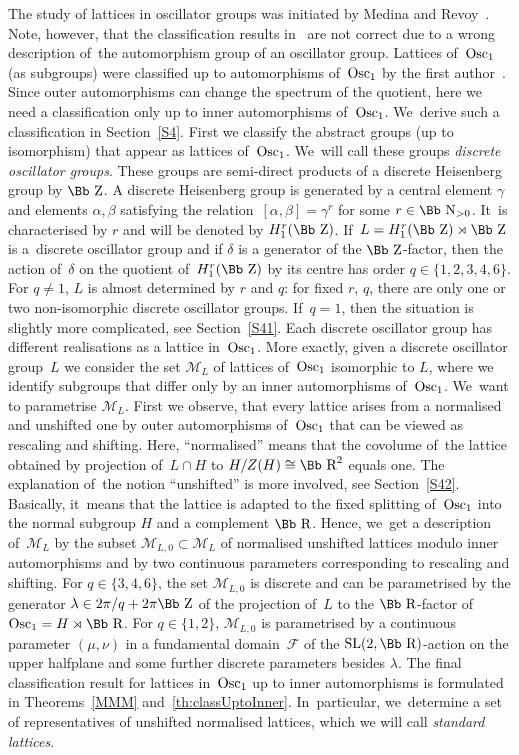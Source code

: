 \documentclass[10pt,a4paper]{amsart}
\newcommand\RR{{\mbox{\Bb R}}}
\newcommand\NN{{\mbox{\Bb N}}}
\newcommand\ZZ{{\mbox{\Bb Z}}}
\newcommand\cM{{\mathcal M}}
\newcommand\cF{{\mathcal F}}
\newcommand{\SL}{\mathop{{\rm SL}}}
\newcommand{\Osc}{{\rm Osc}}
\numberwithin{equation}{section}
\begin{document}
 The study of lattices in oscillator groups was initiated by Medina and Revoy~\cite{MR}. Note, how\-ever, that the classification results in~\cite{MR} are not correct due to a wrong description of~the automorphism group of an oscillator group. Lattices of~$\Osc_1$ (as subgroups) were classified up to automorphisms of~$\Osc_1$ by the first author~\cite{F}. Since outer automorphisms can change the spectrum of the quotient, here we need a classification only up to inner automorphisms of~$\Osc_1$. We~derive such a classification in Section~\ref{S4}. First we classify the abstract groups (up to isomorphism) that appear as lattices of~$\Osc_1$. We~will call these groups {\it discrete oscillator groups}. These groups are semi-direct products of a discrete Heisenberg group by $\ZZ$. A discrete Heisenberg group is generated by a central element $\gamma$ and elements $\alpha,\beta$ satisfying the relation~$[\alpha,\beta]=\gamma^r$ for some $r\in\NN_{>0}$. It~is characterised by $r$ and will be denoted by $H_1^r(\ZZ)$. If~$L=H_1^r(\ZZ)\rtimes \ZZ$ is a~discrete oscillator group and if $\delta$ is a generator of the $\ZZ$-factor, then the action of~$\delta$ on the quotient of~$H_1^r(\ZZ)$ by its centre has order $q\in\{1,2,3,4,6\}$. For $q\not=1$, $L$ is almost determined by $r$ and $q$: for fixed $r$, $q$, there are only one or two non-isomorphic discrete oscillator groups. If~$q=1$, then the situation is slightly more complicated, see Section~\ref{S41}. Each discrete oscillator group has different realisations as a lattice in~$\Osc_1$. More exactly, given a discrete oscillator group~$L$ we consider the set $\cM_L$ of lattices of~$\Osc_1$ isomorphic to $L$, where we identify subgroups that differ only by an inner automorphisms of~$\Osc_1$. We~want to parametrise $\cM_L$. First we observe, that every lattice arises from a normalised and unshifted one by outer automorphisms of~$\Osc_1$ that can be viewed as rescaling and shifting. Here, ``normalised'' means that the covolume of~the lattice obtained by projection of~$L\cap H$ to $H/Z(H)\cong \RR^2$ equals one. The explanation of~the notion ``unshifted'' is more involved, see Section~\ref{S42}. Basically, it~means that the lattice is adapted to the fixed splitting of~$\Osc_1$ into the normal subgroup $H$ and a complement $\RR$. Hence, we~get a description of~$\cM_L$ by the subset $\cM_{L,0}\subset \cM_L$ of normalised unshifted lattices modulo inner automorphisms and by two continuous parameters corresponding to rescaling and shifting. For $q\in\{3,4,6\}$, the set $\cM_{L,0}$ is discrete and can be parametrised by the generator $\lambda\in 2\pi/q +2\pi\ZZ$ of the projection of~$L$ to the $\RR$-factor of~$\Osc_1=H\rtimes \RR$. For $q\in\{1,2\}$, $\cM_{L,0}$ is parametrised by a continuous parameter $(\mu,\nu)$ in a fundamental domain~$\cF$ of the $\SL(2,\RR)$-action on the upper halfplane and some further discrete parameters besides $\lambda$. The final classification result for lattices in~$\Osc_1$ up to inner automorphisms is formulated in Theorems~\ref{MMM} and~\ref{th:classUptoInner}. In~particular, we~determine a set of representatives of unshifted normalised lattices, which we will call {\it standard lattices}.
\end{document}
